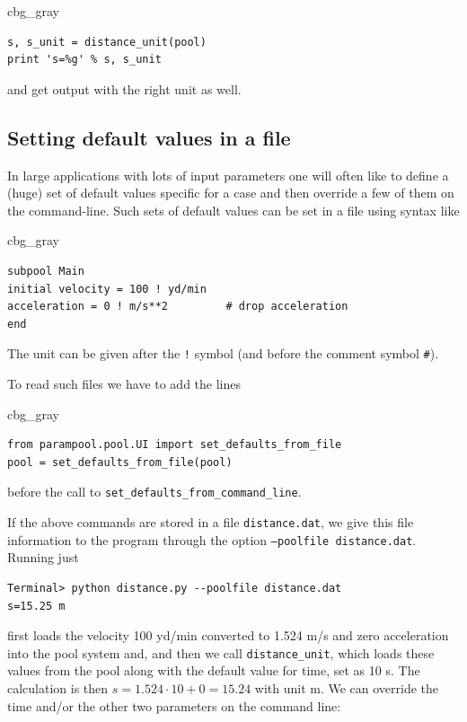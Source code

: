 \documentclass[graybox,envcountchap,sectrefs,final]{svmonodo}
\newenvironment{_cod_tight}[1]{
   \def\FrameCommand{\colorbox{#1}}
   \FrameRule0.6pt\MakeFramed {\FrameRestore}\vskip3mm}
   {\vskip0mm\endMakeFramed}
\newenvironment{cod}[1]{
\bgroup\rmfamily
\fboxsep=0mm\relax
\begin{_cod_tight}{#1}
\list{}{\parsep=-2mm\parskip=0mm\topsep=0pt\leftmargin=2mm
\rightmargin=2\leftmargin\leftmargin=4pt\relax}
\item\relax}
{\endlist\end{_cod_tight}\egroup}
\begin{document}
\begin{cod}{cbg_gray}\begin{Verbatim}[numbers=none,fontsize=\fontsize{9pt}{9pt},baselinestretch=0.95,xleftmargin=2mm]
s, s_unit = distance_unit(pool)
print 's=%g' % s, s_unit
\end{Verbatim}
\end{cod}
\noindent
and get output with the right unit as well.

\subsection{Setting default values in a file}

In large applications with lots of input parameters one will often like
to define a (huge) set of default values specific for a case and then
override a few of them on the command-line. Such sets of default values
can be set in a file using syntax like

\begin{cod}{cbg_gray}\begin{Verbatim}[numbers=none,fontsize=\fontsize{9pt}{9pt},baselinestretch=0.95,xleftmargin=2mm]
subpool Main
initial velocity = 100 ! yd/min
acceleration = 0 ! m/s**2         # drop acceleration
end
\end{Verbatim}
\end{cod}
\noindent
The unit can be given after the \Verb?!? symbol (and before the comment symbol \Verb!#!).

To read such files we have to add the lines

\begin{cod}{cbg_gray}\begin{Verbatim}[numbers=none,fontsize=\fontsize{9pt}{9pt},baselinestretch=0.95,xleftmargin=2mm]
from parampool.pool.UI import set_defaults_from_file
pool = set_defaults_from_file(pool)
\end{Verbatim}
\end{cod}
\noindent
before the call to \Verb!set_defaults_from_command_line!.

If the above commands are stored in a file \texttt{distance.dat}, we give
this file information to the program through the
option \texttt{--poolfile distance.dat}. Running just

\begin{Verbatim}[frame=lines,label=\fbox{{\tiny Terminal}},framesep=2.5mm,framerule=0.7pt,fontsize=\fontsize{9pt}{9pt}]
Terminal> python distance.py --poolfile distance.dat
s=15.25 m
\end{Verbatim}
first loads the velocity
100 yd/min converted to 1.524 m/s and zero acceleration
into the pool system and, and then we call \Verb!distance_unit!, which
loads these values from the pool along with the default value for
time, set as 10 s. The calculation is then $s=1.524\cdot 10 + 0=15.24$
with unit m. We can override the time and/or the other two
parameters on the command line:
\end{document}
